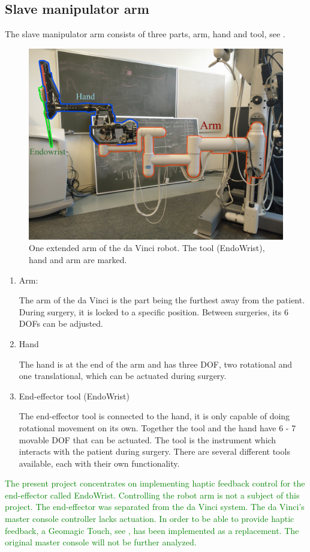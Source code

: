 

\subsection*{Slave manipulator arm}
The slave manipulator arm consists of three parts, arm, hand and tool, see .

\begin{figure}[H]
	\centering
		\centering
		\includegraphics[width=0.85\linewidth]{davincirobotarm_label.jpg}
		\caption{One extended arm of the da Vinci robot. The tool (EndoWrist), hand and arm are marked.}
		\label{fig:davinciarmrobot}
\end{figure}


\begin{enumerate}
\item Arm:

The arm of the da Vinci is the part being the furthest away from the patient. 
During surgery, it is locked to a specific position. Between surgeries, its 6 \gls{DOF}s can be adjusted.
\item Hand

The hand is at the end of the arm and has three \gls{DOF}, two rotational and one translational, which can be actuated during surgery. 
\item End-effector tool (EndoWrist)

The end-effector tool is connected to the hand, it is only capable of doing rotational movement on its own. Together the tool and the hand have 6 - 7 movable \gls{DOF} that can be actuated. The tool is the instrument which interacts with the patient during surgery. There are several different tools available, each with their own functionality. 
\end{enumerate}

\textcolor{green}{The present project concentrates on implementing haptic feedback control for the end-effector called EndoWrist. Controlling the robot arm is not a subject of this project. The end-effector was separated from the da Vinci system. }
	\textcolor{green}{
The da Vinci's master console controller lacks actuation. In order to be able to provide haptic feedback, a Geomagic Touch, see , has been implemented as a replacement. The original master console will not be further analyzed. 	
}